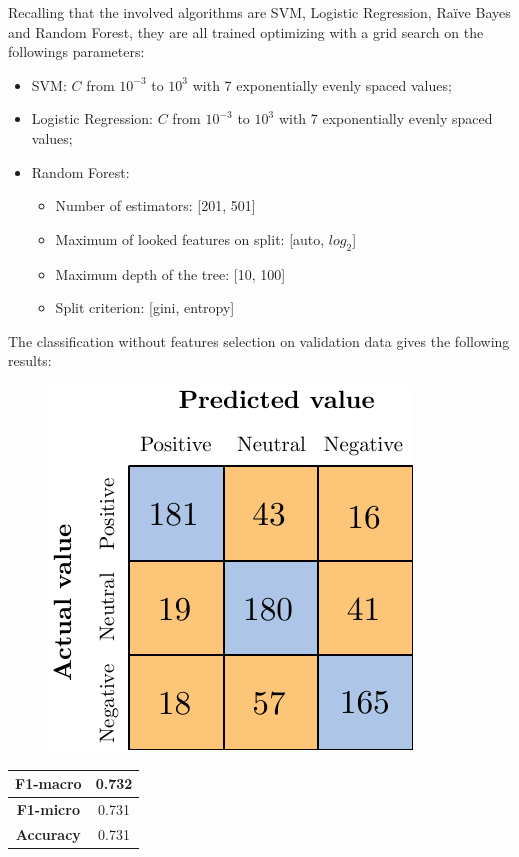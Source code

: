 Recalling that the involved algorithms are SVM, Logistic Regression, Ra{\"i}ve Bayes and Random Forest, they are all trained optimizing with a grid search on the followings parameters:
\begin{itemize}
	\item SVM: $C$ from $10^{-3}$ to $10^3$ with 7 exponentially evenly spaced values;
	\item Logistic Regression: $C$ from $10^{-3}$ to $10^3$ with 7 exponentially evenly spaced values;
	\item Random Forest: 
	\begin{itemize}
		\item Number of estimators: [201, 501]
		\item Maximum of looked features on split: [auto, $log_2$]
		\item Maximum depth of the tree: [10, 100]
		\item Split criterion: [gini, entropy]
	\end{itemize}
\end{itemize}

The classification without features selection on validation data gives the following results:

\begin{figure}[H]
	\centering
	\includegraphics[scale=1]{figures/conf_matrices/twitter_snt_bpef/twitter_snt_bpef_bfs.pdf}
	\label{fig:tw_snt_bpef_bfs}
\end{figure}

\begin{center}
	\begin{tabular}{ | c | c | } 
		\hline
		\textbf{F1-macro} & 0.732 \\
		\hline
		\textbf{F1-micro} & 0.731 \\ 
		\hline
		\textbf{Accuracy} & 0.731 \\ 
		\hline
	\end{tabular}
\end{center}

